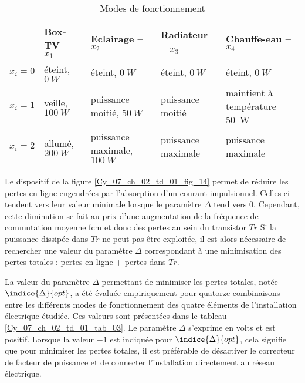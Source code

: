 \begin{table*}[!h]
\centering
\begin{tabular}{cp{3cm}p{3.5cm}p{3.5cm}p{3.5cm}}
\hline
& Box-TV  -- $x_1$ & Eclairage -- $x_2$ & Radiateur -- $x_3$ & Chauffe-eau -- $x_4$  \\
\hline
$x_i = 0$ & éteint, $\SI{0}{W}$	& éteint, $\SI{0}{W}$	& éteint, $\SI{0}{W}$	& éteint, $\SI{0}{W}$ \\
$x_i = 1$ & veille, $\SI{100}{W}$	& puissance moitié, $\SI{50}{W}$	& puissance moitié & maintient à température \SI{50}{W}	\\
$x_i = 2$ & allumé, $\SI{200}{W}$	& puissance maximale, $\SI{100}{W}$	& puissance maximale & puissance maximale \\
\hline
\end{tabular}
\caption{Modes de fonctionnement \label{Cy_07_ch_02_td_01_tab_02}}
\end{table*}


Le dispositif de la figure \ref{Cy_07_ch_02_td_01_fig_14} permet de réduire les pertes
en ligne engendrées par l’absorption d’un courant impulsionnel. Celles-ci tendent vers leur
valeur minimale lorsque le paramètre $\Delta$ tend vers 0. Cependant, cette diminution se fait au
prix d’une augmentation de la fréquence de commutation moyenne fcm et donc des pertes
au sein du transistor $Tr$ %
Si la puissance dissipée dans $Tr$ ne peut pas être
exploitée, il est alors nécessaire de rechercher une valeur du paramètre $\Delta$ correspondant à
une minimisation des pertes totales : pertes en ligne + pertes dans $Tr$.

La valeur du paramètre $\Delta$ permettant de minimiser les pertes totales, notée $\indice{\Delta}{opt}$, a été évaluée empiriquement pour quatorze combinaisons entre les différents modes de fonctionnement
des quatre éléments de l’installation électrique étudiée. Ces valeurs sont présentées dans le
tableau \ref{Cy_07_ch_02_td_01_tab_03}. Le paramètre $\Delta$ s’exprime en volts et est positif. Lorsque la valeur $-1$ est indiquée
pour $\indice{\Delta}{opt}$, cela signifie que pour minimiser les pertes totales, il est préférable de désactiver
le correcteur de facteur de puissance et de connecter l’installation directement au réseau
électrique.


